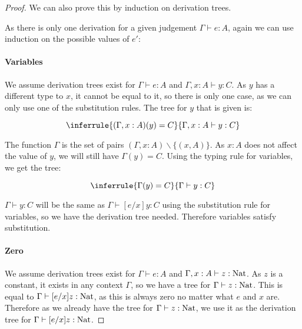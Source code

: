\begin{proof}
We can also prove this by induction on derivation trees. %


As there is only one derivation for a given judgement $\Gamma \vdash e : A$, again we can use induction on the possible values of $e'$:

\paragraph{Variables} We assume derivation trees exist for $\Gamma \vdash e : A$ and $\Gamma, x : A \vdash y : C$. As $y$ has a different type to $x$, it cannot be equal to it, so there is only one case, as we can only use one of the substitution rules. The tree for $y$ that is given is:

$$\inferrule{(\Gamma,x:A)(y) = C}{\Gamma, x:A \vdash y : C}$$

The function $\Gamma$ is the set of pairs $(\Gamma,x:A)\backslash \{(x,A)\}$. As $x:A$ does not affect the value of $y$, we will still have $\Gamma(y) = C$. Using the typing rule for variables, we get the tree:

$$\inferrule{\Gamma(y) = C}{\Gamma \vdash y : C}$$

$\Gamma \vdash y : C$ will be the same as $\Gamma \vdash [e/x]y : C$ using the substitution rule for variables, so we have the derivation tree needed. Therefore variables satisfy substitution.  

\paragraph{Zero} We assume derivation trees exist for $\Gamma \vdash e : A$ and $\Gamma, x : A \vdash z : \operatorname{Nat}$. As $z$ is a constant, it exists in any context $\Gamma$, so we have a tree for $\Gamma \vdash z : \operatorname{Nat}$. This is equal to $\Gamma \vdash [e/x]z : \operatorname{Nat}$, as this is always zero no matter what $e$ and $x$ are. Therefore as we already have the tree for $\Gamma \vdash z : \operatorname{Nat}$, we use it as the derivation tree for $\Gamma \vdash [e/x]z : \operatorname{Nat}$.


\end{proof}
